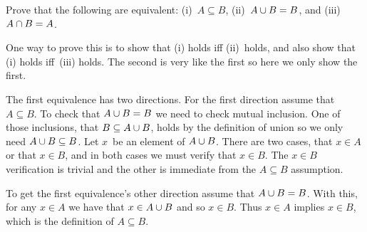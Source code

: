 \documentclass{test}  %
\begin{document}



\begin{ex} Prove that the following are equivalent:
(i)~$A\subseteq B$,
(ii)~$A\cup B=B$,    
and (iii)~$A\cap B=A$.
\begin{ans}
One way to prove this is to 
show that (i) holds iff (ii)~holds, and also show that (i) holds iff~(iii) 
holds.
The second is very like the first so here we only show the first.

The first equivalence has two directions.
For the first direction assume that $A\subseteq B$. 
To check that $A\cup B=B$ we need to check mutual inclusion.
One of those inclusions, that $B\subseteq A\cup B$, holds by the definition 
of union so we only need  $A\cup B\subseteq B$.
Let $x$~be an element of $A\cup B$.
There are two cases, that $x\in A$ or that $x\in B$, and in both cases
we must verify that $x\in B$.
The $x\in B$ verification is trivial and the other is 
immediate from the $A\subseteq B$ assumption.

To get the first equivalence's other direction assume that $A\cup B=B$.
With this, for any $x\in A$ we have that $x\in A\cup B$ and so $x\in B$.
Thus $x\in A$ implies $x\in B$, which is the definition of $A\subseteq B$.
\end{ans}
\end{ex}
\end{document}
